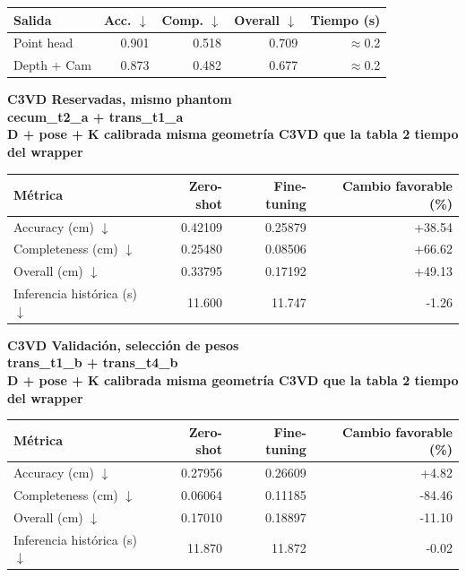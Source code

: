 \documentclass[10pt,a4paper]{article}
\begin{document}
\vspace{2mm}
\begingroup\small
\begin{tabularx}{\textwidth}{@{}LRRRR@{}}
\toprule
\textbf{Salida} & \textbf{Acc. \(\downarrow\)} & \textbf{Comp. \(\downarrow\)} & \textbf{Overall \(\downarrow\)} & \textbf{Tiempo (s)} \\
\midrule
Point head & 0.901 & 0.518 & 0.709 & \(\approx\)0.2 \\
Depth + Cam & 0.873 & 0.482 & 0.677 & \(\approx\)0.2 \\
\bottomrule
\end{tabularx}
\endgroup
\vspace{6mm}
{\small\bfseries C3VD \textperiodcentered{} Reservadas, mismo phantom\\cecum\_t2\_a + trans\_t1\_a\\D + pose + K calibrada \textperiodcentered{} misma geometría C3VD que la tabla 2 \textperiodcentered{} tiempo del wrapper}\par
\vspace{2mm}
\begingroup\small
\begin{tabularx}{\textwidth}{@{}LRRR@{}}
\toprule
\textbf{Métrica} & \textbf{Zero-shot} & \textbf{Fine-tuning} & \textbf{Cambio favorable (\%)} \\
\midrule
Accuracy (cm) \(\downarrow\) & 0.42109 & 0.25879 & +38.54 \\
Completeness (cm) \(\downarrow\) & 0.25480 & 0.08506 & +66.62 \\
Overall (cm) \(\downarrow\) & 0.33795 & 0.17192 & +49.13 \\
Inferencia histórica (s) \(\downarrow\) & 11.600 & 11.747 & -1.26 \\
\bottomrule
\end{tabularx}
\endgroup
\vspace{6mm}
{\small\bfseries C3VD \textperiodcentered{} Validación, selección de pesos\\trans\_t1\_b + trans\_t4\_b\\D + pose + K calibrada \textperiodcentered{} misma geometría C3VD que la tabla 2 \textperiodcentered{} tiempo del wrapper}\par
\vspace{2mm}
\begingroup\small
\begin{tabularx}{\textwidth}{@{}LRRR@{}}
\toprule
\textbf{Métrica} & \textbf{Zero-shot} & \textbf{Fine-tuning} & \textbf{Cambio favorable (\%)} \\
\midrule
Accuracy (cm) \(\downarrow\) & 0.27956 & 0.26609 & +4.82 \\
Completeness (cm) \(\downarrow\) & 0.06064 & 0.11185 & -84.46 \\
Overall (cm) \(\downarrow\) & 0.17010 & 0.18897 & -11.10 \\
Inferencia histórica (s) \(\downarrow\) & 11.870 & 11.872 & -0.02 \\
\bottomrule
\end{tabularx}
\end{document}

